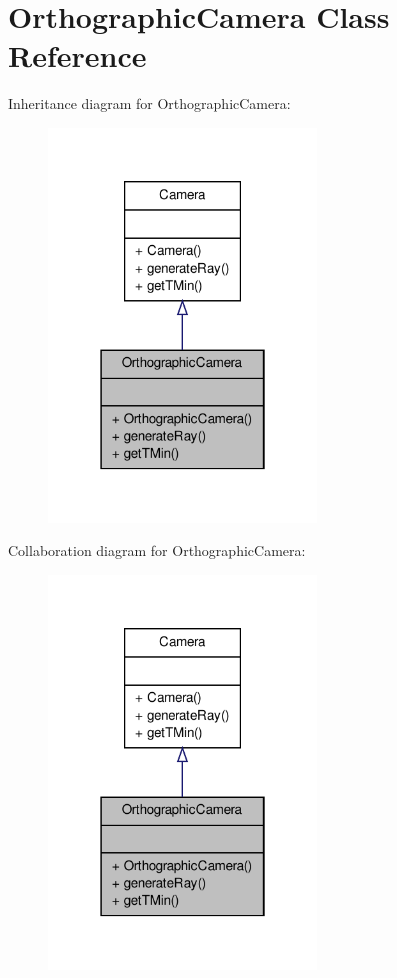 \hypertarget{classOrthographicCamera}{\section{\-Orthographic\-Camera \-Class \-Reference}
\label{classOrthographicCamera}
}


\-Inheritance diagram for \-Orthographic\-Camera\-:
\nopagebreak
\begin{figure}[H]
\begin{center}
\leavevmode
\includegraphics[width=202pt]{classOrthographicCamera__inherit__graph}
\end{center}
\end{figure}


\-Collaboration diagram for \-Orthographic\-Camera\-:
\nopagebreak
\begin{figure}[H]
\begin{center}
\leavevmode
\includegraphics[width=202pt]{classOrthographicCamera__coll__graph}
\end{center}
\end{figure}
